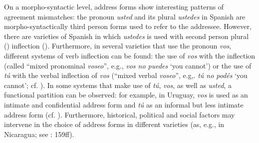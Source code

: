 \documentclass[output=paper]{langscibook}
\begin{document}
\textrm{On a morpho-syntactic level, address forms show interesting patterns of agreement mismatches: the pronoun \textit{usted} and its plural \textit{ustedes} in Spanish are mor\-pho-syn\-tac\-tic\-ally third person forms used to refer to the addressee. However, there are varieties of Spanish in which  \textit{ustedes}  is used with second person plural () inflection (\citealt[254]{DeJongeNieuwenhuijsen2012}). Furthermore, in several varieties that use the  pronoun \textit{vos}, different systems of verb inflection can be found: the use of \textit{vos}  with the  inflection (called “mixed pronominal \textit{voseo}”, e.g., \textit{vos no puedes}  ‘you cannot’) or the use of \textit{tú} with the verbal inflection of \textit{vos}  (“mixed verbal \textit{voseo}”, e.g,. \textit{tú no podés}  ‘you cannot’; cf. \citealt[256--257]{DeJongeNieuwenhuijsen2012}). In some systems that make use of \textit{tú}}, \textit{vos}, as well as \textit{usted}, a functional partition can be observed: for example, in Uruguay, \textit{vos}  is used as an intimate and confidential address form and \textit{tú} as an informal but less intimate address form (cf. \cites[258]{DeJongeNieuwenhuijsen2012}[329]{HualdeTravis2010}). Furthermore, historical, political and social factors may intervene in the choice of address forms in different varieties (as, e.g., in Nicaragua; see \citealt{Lipski1994}: 159ff).
\end{document}
